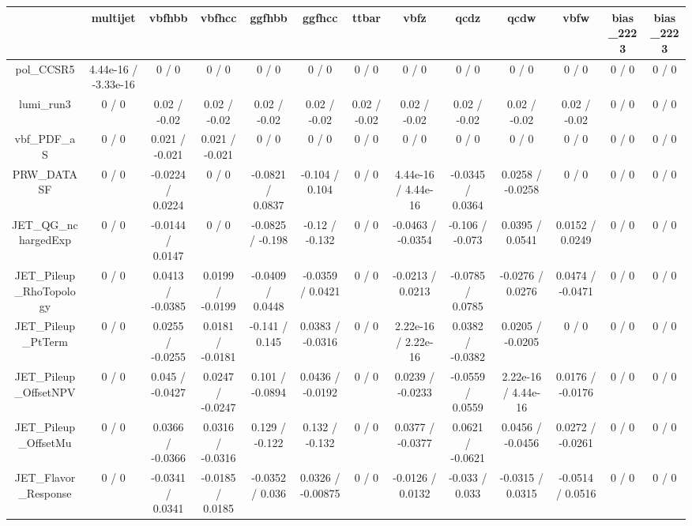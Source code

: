 \documentclass[10pt]{article}
\begin{document}
\begin{table}[htbp]
\begin{center}
\begin{tabular}{|c|c|c|c|c|c|c|c|c|c|c|c|c|}
\hline 
      & multijet      & vbfhbb      & vbfhcc      & ggfhbb      & ggfhcc      & ttbar      & vbfz      & qcdz      & qcdw      & vbfw      & bias_2223      & bias_2223 \\ 
\hline 
  pol_CCSR5 & 4.44e-16 / -3.33e-16 & 0 / 0 & 0 / 0 & 0 / 0 & 0 / 0 & 0 / 0 & 0 / 0 & 0 / 0 & 0 / 0 & 0 / 0 & 0 / 0 & 0 / 0 \\ 
  lumi_run3 & 0 / 0 & 0.02 / -0.02 & 0.02 / -0.02 & 0.02 / -0.02 & 0.02 / -0.02 & 0.02 / -0.02 & 0.02 / -0.02 & 0.02 / -0.02 & 0.02 / -0.02 & 0.02 / -0.02 & 0 / 0 & 0 / 0 \\ 
  vbf_PDF_aS & 0 / 0 & 0.021 / -0.021 & 0.021 / -0.021 & 0 / 0 & 0 / 0 & 0 / 0 & 0 / 0 & 0 / 0 & 0 / 0 & 0 / 0 & 0 / 0 & 0 / 0 \\ 
  PRW_DATASF & 0 / 0 & -0.0224 / 0.0224 & 0 / 0 & -0.0821 / 0.0837 & -0.104 / 0.104 & 0 / 0 & 4.44e-16 / 4.44e-16 & -0.0345 / 0.0364 & 0.0258 / -0.0258 & 0 / 0 & 0 / 0 & 0 / 0 \\ 
  JET_QG_nchargedExp & 0 / 0 & -0.0144 / 0.0147 & 0 / 0 & -0.0825 / -0.198 & -0.12 / -0.132 & 0 / 0 & -0.0463 / -0.0354 & -0.106 / -0.073 & 0.0395 / 0.0541 & 0.0152 / 0.0249 & 0 / 0 & 0 / 0 \\ 
  JET_Pileup_RhoTopology & 0 / 0 & 0.0413 / -0.0385 & 0.0199 / -0.0199 & -0.0409 / 0.0448 & -0.0359 / 0.0421 & 0 / 0 & -0.0213 / 0.0213 & -0.0785 / 0.0785 & -0.0276 / 0.0276 & 0.0474 / -0.0471 & 0 / 0 & 0 / 0 \\ 
  JET_Pileup_PtTerm & 0 / 0 & 0.0255 / -0.0255 & 0.0181 / -0.0181 & -0.141 / 0.145 & 0.0383 / -0.0316 & 0 / 0 & 2.22e-16 / 2.22e-16 & 0.0382 / -0.0382 & 0.0205 / -0.0205 & 0 / 0 & 0 / 0 & 0 / 0 \\ 
  JET_Pileup_OffsetNPV & 0 / 0 & 0.045 / -0.0427 & 0.0247 / -0.0247 & 0.101 / -0.0894 & 0.0436 / -0.0192 & 0 / 0 & 0.0239 / -0.0233 & -0.0559 / 0.0559 & 2.22e-16 / 4.44e-16 & 0.0176 / -0.0176 & 0 / 0 & 0 / 0 \\ 
  JET_Pileup_OffsetMu & 0 / 0 & 0.0366 / -0.0366 & 0.0316 / -0.0316 & 0.129 / -0.122 & 0.132 / -0.132 & 0 / 0 & 0.0377 / -0.0377 & 0.0621 / -0.0621 & 0.0456 / -0.0456 & 0.0272 / -0.0261 & 0 / 0 & 0 / 0 \\ 
  JET_Flavor_Response & 0 / 0 & -0.0341 / 0.0341 & -0.0185 / 0.0185 & -0.0352 / 0.036 & 0.0326 / -0.00875 & 0 / 0 & -0.0126 / 0.0132 & -0.033 / 0.033 & -0.0315 / 0.0315 & -0.0514 / 0.0516 & 0 / 0 & 0 / 0 \\ 

\end{tabular}
\end{center}
\end{table}
\end{document}
